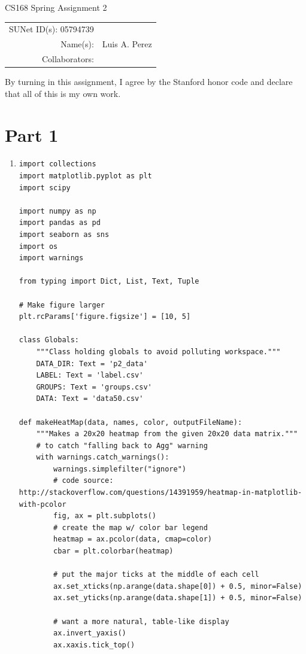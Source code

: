\documentclass[12pt]{article}
\begin{document}
\begin{center}
{\Large CS168 Spring Assignment 2}

\begin{tabular}{rl}
SUNet ID(s): 05794739 & \\
Name(s): & Luis A. Perez \\
Collaborators: &
\end{tabular}
\end{center}

By turning in this assignment, I agree by the Stanford honor code and declare
that all of this is my own work.

\section*{Part 1}

\begin{enumerate}[label=(\alph*)]
  \item
    \begin{verbatim}
import collections
import matplotlib.pyplot as plt
import scipy

import numpy as np
import pandas as pd
import seaborn as sns
import os
import warnings

from typing import Dict, List, Text, Tuple

# Make figure larger
plt.rcParams['figure.figsize'] = [10, 5]

class Globals:
    """Class holding globals to avoid polluting workspace."""
    DATA_DIR: Text = 'p2_data'
    LABEL: Text = 'label.csv'
    GROUPS: Text = 'groups.csv'
    DATA: Text = 'data50.csv'

def makeHeatMap(data, names, color, outputFileName):
    """Makes a 20x20 heatmap from the given 20x20 data matrix."""
    # to catch "falling back to Agg" warning
    with warnings.catch_warnings():
        warnings.simplefilter("ignore")
        # code source: http://stackoverflow.com/questions/14391959/heatmap-in-matplotlib-with-pcolor
        fig, ax = plt.subplots()
        # create the map w/ color bar legend
        heatmap = ax.pcolor(data, cmap=color)
        cbar = plt.colorbar(heatmap)

        # put the major ticks at the middle of each cell
        ax.set_xticks(np.arange(data.shape[0]) + 0.5, minor=False)
        ax.set_yticks(np.arange(data.shape[1]) + 0.5, minor=False)

        # want a more natural, table-like display
        ax.invert_yaxis()
        ax.xaxis.tick_top()


\end{verbatim}
\end{enumerate}
\end{document}
